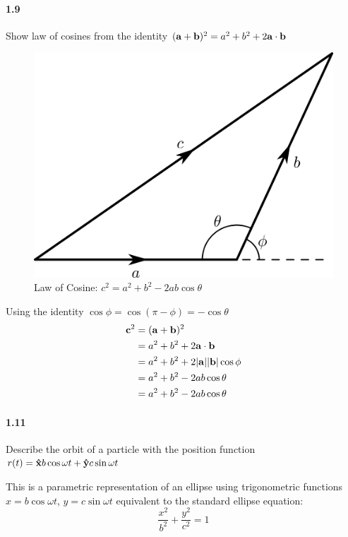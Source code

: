 \documentclass[../problems.tex]{subfiles}
\begin{document}
\paragraph{1.9}
Show law of cosines from the identity $(\mathbf{a} + \mathbf{b})^2 = a^2 + b^2 + 2 \mathbf{a} \cdot 
\mathbf{b}$
\barh

\begin{figure}[ht]
    \centering
    \includegraphics{fig1_9.png}
    \caption{Law of Cosine: $c^2 = a^2 + b^2 - 2ab\cos{\theta}$}
\end{figure}

Using the identity $\cos{\phi} = \cos{(\pi - \phi)} = - \cos{\theta}$
\begin{align*}
    \mathbf{c}^2 &= (\mathbf{a} + \mathbf{b})^2 \\
    &= a^2 + b^2 + 2 \mathbf{a} \cdot \mathbf{b} \\
    &= a^2 + b^2 + 2 |\mathbf{a}||\mathbf{b}| \cos{\phi} \\
    &= a^2 + b^2 - 2 ab \cos{\theta} \\
    &= a^2 + b^2 - 2ab\cos{\theta}
\end{align*}

\paragraph{1.11}
Describe the orbit of a particle with the position function $r(t) = \mathbf{\hat x} b \cos{\omega t} 
+ \mathbf{\hat y} c \sin{\omega t}$
\barh

This is a parametric representation of an ellipse using trigonometric functions 
$x = b \cos{\omega t}$, $y = c \sin{\omega t}$
equivalent to the standard ellipse equation:
\begin{equation*}
    \frac{x^2}{b^2} + \frac{y^2}{c^2} = 1
\end{equation*}
\end{document}
